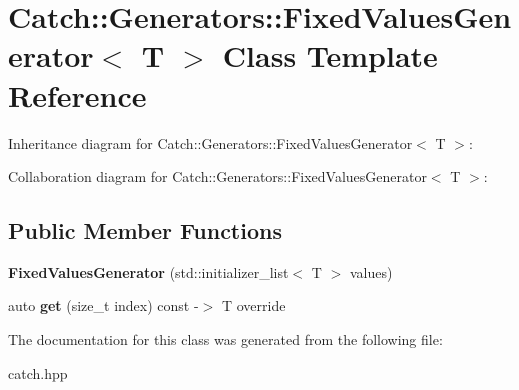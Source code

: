 \hypertarget{classCatch_1_1Generators_1_1FixedValuesGenerator}{}\section{Catch\+:\+:Generators\+:\+:Fixed\+Values\+Generator$<$ T $>$ Class Template Reference}
\label{classCatch_1_1Generators_1_1FixedValuesGenerator}


Inheritance diagram for Catch\+:\+:Generators\+:\+:Fixed\+Values\+Generator$<$ T $>$\+:


Collaboration diagram for Catch\+:\+:Generators\+:\+:Fixed\+Values\+Generator$<$ T $>$\+:
\subsection*{Public Member Functions}
\begin{DoxyCompactItemize}
\item 
\mbox{\label{classCatch_1_1Generators_1_1FixedValuesGenerator_a6e9f473655413c1cb15f079890f06b86}} 
{\bfseries Fixed\+Values\+Generator} (std\+::initializer\+\_\+list$<$ T $>$ values)
\item 
\mbox{\label{classCatch_1_1Generators_1_1FixedValuesGenerator_a3ed654a5860c170dbe7b01487b83253d}} 
auto {\bfseries get} (size\+\_\+t index) const -\/$>$ T override
\end{DoxyCompactItemize}


The documentation for this class was generated from the following file\+:\begin{DoxyCompactItemize}
\item 
catch.\+hpp\end{DoxyCompactItemize}
